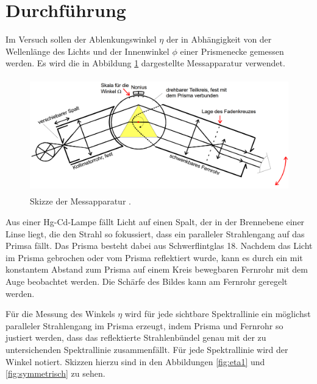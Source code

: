 \section{Durchführung}
\label{sec:Durchführung}
Im Versuch sollen der Ablenkungswinkel $\eta$ der in Abhängigkeit von der Wellenlänge
des Lichts und der Innenwinkel $\phi$ einer Prismenecke gemessen werden. Es wird
die in Abbildung \ref{fig:geraet} dargestellte Messapparatur verwendet.

\begin{figure}[H]
  \centering
  \includegraphics[height=5cm]{data/aufbau.png}
  \caption{Skizze der Messapparatur \cite{Versuchsanleitung}.}
  \label{fig:geraet}
\end{figure}

Aus einer Hg-Cd-Lampe fällt Licht auf einen Spalt, der in der Brennebene einer Linse
liegt, die den Strahl so fokussiert, dass ein paralleler Strahlengang auf das Primsa fällt.
Das Prisma besteht dabei aus Schwerflintglas 18. Nachdem das Licht im Prisma gebrochen oder vom
Prisma reflektiert wurde, kann es durch ein mit konstantem Abstand zum Prisma auf
einem Kreis bewegbaren Fernrohr mit dem Auge beobachtet werden. Die Schärfe des Bildes
kann am Fernrohr geregelt werden.

Für die Messung des Winkels $\eta$ wird für jede sichtbare Spektrallinie ein möglichst
paralleler Strahlengang im Prisma erzeugt, indem Prisma und Fernrohr so justiert werden,
dass das reflektierte Strahlenbündel genau mit der zu untersichenden Spektrallinie zusammenfällt.
Für jede Spektrallinie wird der Winkel notiert. Skizzen hierzu sind in den Abbildungen
\ref{fig:eta1} und \ref{fig:symmetrisch} zu sehen.

